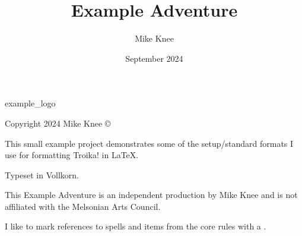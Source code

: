 \documentclass[a5paper, openany, twoside, 10pt]{memoir}
\title{Example Adventure}
\author{Mike Knee}
\date{September 2024}
\begin{document}

    
    
    



\begin{copyrightpage}{example_logo}

Copyright 2024 Mike Knee \copyright

This small example project demonstrates some of the setup/standard formats I use for formatting Troika! in \LaTeX.

Typeset in Vollkorn.

This Example Adventure is an independent production by Mike Knee and is not affiliated with the Melsonian Arts Council.

I like to mark references to spells and items from the core  rules with a \corereference.

\end{copyrightpage}

\tableofcontents

\vfill
\pagebreak
\sloppy
\end{document}
